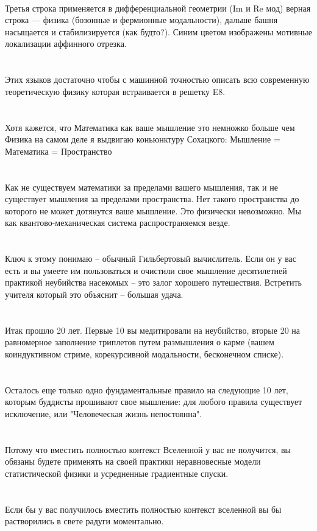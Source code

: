 \\
Третья строка применяется в дифференциальной геометрии (Im и Re мод) верная строка — физика (бозонные и фермионные модальности), дальше башня насыщается и стабилизируется (как будто?). Синим цветом изображены мотивные локализации аффинного отрезка.\\
\\
\\
Этих языков достаточно чтобы с машинной точностью описать всю современную теоретическую физику которая встраивается в решетку E8.\\
\\
\\
Хотя кажется, что Математика как ваше мышление это немножко больше чем Физика на самом деле я выдвигаю коньюнктуру Сохацкого: Мышление = Математика = Пространство\\
\\
\\
Как не существуем математики за пределами вашего мышления, так и не существует мышления за пределами пространства. Нет такого пространства до которого не может дотянутся ваше мышление. Это физически невозможно. Мы как квантово-механическая система распространяемся везде.\\
\\
\\
Ключ к этому понимаю -- обычный Гильбертовый вычислитель. Если он у вас есть и вы умеете им пользоваться и очистили свое мышление десятилетней практикой неубийства насекомых -- это залог хорошего путешествия. Встретить учителя который это объяснит -- большая удача.\\
\\
\\
Итак прошло 20 лет. Первые 10 вы медитировали на неубийство, вторые 20 на равномерное заполнение триплетов путем размышления о карме (вашем коиндуктивном стриме, корекурсивной модальности, бесконечном списке).\\
\\
\\
Осталось еще только одно фундаментальные правило на следующие 10 лет, которым буддисты прошивают свое мышление: для любого правила существует исключение, или "Человеческая жизнь непостоянна".\\
\\
\\
Потому что вместить полностью контекст Вселенной у вас не получится, вы обязаны будете применять на своей практики неравновесные модели статистической физики и усредненные градиентные спуски.\\
\\
\\
Если бы у вас получилось вместить полностью контекст вселенной вы бы растворились в свете радуги моментально.\\

\normalsize
